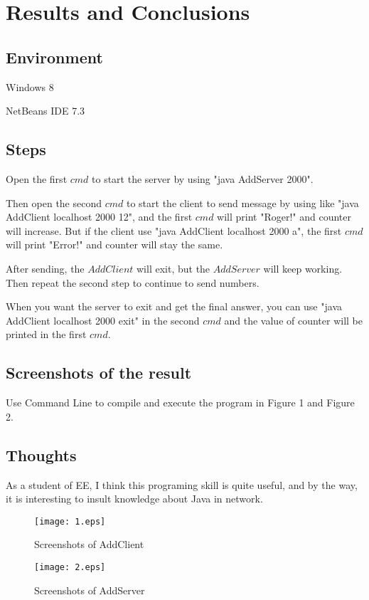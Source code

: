 \documentclass{article}
\begin{document}

\section{Results and Conclusions}
\subsection{Environment}
\begin{compactitem}
\item Windows 8
\item NetBeans IDE 7.3
\end{compactitem}
\subsection{Steps}
\begin{compactitem}
\item Open the first $cmd$ to start the server by using "java AddServer 2000".
\item Then open the second $cmd$ to start the client to send message by using like "java AddClient localhost 2000 12", and the first $cmd$ will print "Roger!" and counter will increase. But if the client use "java AddClient localhost 2000 a", the first $cmd$ will print "Error!" and counter will stay the same.
\item After sending, the $AddClient$ will exit, but the $AddServer$ will keep working. Then repeat the second step to continue to send numbers.
\item When you want the server to exit and get the final answer, you can use "java AddClient localhost 2000 exit" in the second $cmd$ and the value of counter will be printed in the first $cmd$.
\end{compactitem}
\subsection{Screenshots of the result}
Use Command Line to compile and execute the program in Figure 1 and Figure 2.

\subsection{Thoughts}
As a student of EE, I think this programing skill is quite useful, and by the way, it is interesting to insult knowledge about Java in network.
\begin{figure}[h]
\centering
\texttt{[image: 1.eps]}
\caption{Screenshots of AddClient}
\end{figure}
\begin{figure}[h]
\centering
\texttt{[image: 2.eps]}
\caption{Screenshots of AddServer}
\end{figure}
\end{document}
